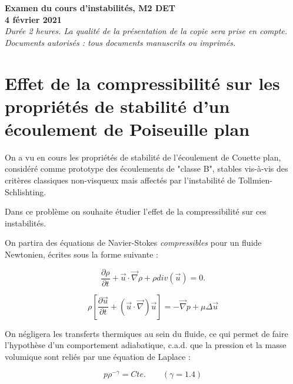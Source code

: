 \documentclass[a4paper,11pt]{article}
\begin{document}
{\Large
\noindent

\begin{center}
{\bf Examen du cours d'instabilités, M2 DET \\
 4 février 2021} \\
{\it \small Durée 2 heures. La qualité de la présentation de la copie sera prise en compte. 
} \\
{\it \small Documents autorisés : tous documents manuscrits ou imprimés.}
\end{center}



}



\newcommand{\rep}[1]{  }
%

\section{Effet de la compressibilité sur les propriétés de stabilité d'un écoulement de Poiseuille plan}

On a vu en cours les propriétés de stabilité de l'écoulement de Couette plan, considéré comme prototype des écoulements de "classe B", stables vis-à-vis des critères classiques non-visqueux mais affectés par l'instabilité de Tollmien-Schlishting.

Dans ce problème on souhaite étudier l'effet de la compressibilité sur ces instabilités.

On partira des équations de Navier-Stokes {\em compressibles } pour un fluide Newtonien, écrites sous la forme suivante :

$$
\frac{\partial \rho}{\partial t} + \vec{u} \cdot \vec{\nabla} \rho + \rho div ( \vec{u} ) = 0.
$$

$$
\rho \left[ \frac{\partial \vec{u}}{\partial t} + (\vec{u} \cdot \vec{\nabla}) \vec{u} \right] = - \vec{\nabla} p + \mu \Delta  \vec{u}
$$

On négligera les transferts thermiques au sein du fluide, ce qui permet de faire l'hypothèse d'un comportement adiabatique,
c.a.d. que la pression et la masse volumique sont reliés par une équation de Laplace : 

$$
p \rho^{-\gamma} = Cte. \qquad (\gamma = 1.4) 
$$
 
\end{document}
